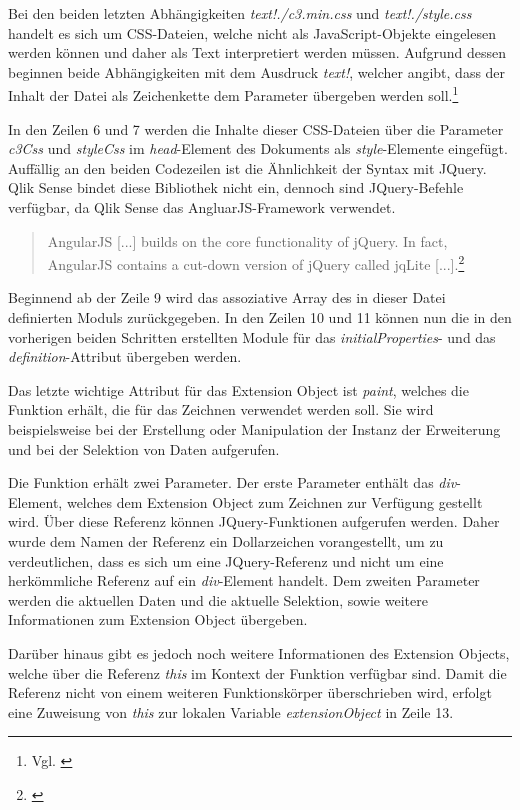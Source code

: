 Bei den beiden letzten Abhängig\-keiten \textit{text!./c3.min.css} und \textit{text!./style.css} handelt es sich um CSS-Dateien, welche nicht als JavaScript-Objekte eingelesen werden können und daher als Text interpretiert werden müssen. Aufgrund dessen beginnen beide Abhängig\-keiten mit dem Ausdruck \textit{text!}, welcher angibt, dass der Inhalt der Datei als Zeichenkette dem Parameter übergeben werden soll.\footnote{Vgl. \cite{SpecifyATextFileDependency}}

In den Zeilen 6 und 7 werden die Inhalte dieser CSS-Dateien über die Parameter \textit{c3Css} und \textit{styleCss} im \textit{head}-Element des Dokuments als \textit{style}-Elemente eingefügt. Auffällig an den beiden Codezeilen ist die Ähnlich\-keit der Syntax mit JQuery. Qlik Sense bindet diese Bibliothek nicht ein, dennoch sind JQuery-Befehle verfügbar, da Qlik Sense das AngluarJS-Framework verwendet.
\begin{quote}
AngularJS [...] builds on the core functionality of jQuery. In fact, AngularJS contains a cut-down version of jQuery called jqLite [...].\footnote{\cite[S. 47]{Freeman2014}}
\end{quote}


Beginnend ab der Zeile 9 wird das assoziative Array des in dieser Datei definierten Moduls zurückgegeben. In den Zeilen 10 und 11 können nun die in den vorherigen beiden Schritten erstellten Module für das \textit{initialProperties}- und das \textit{definition}-Attribut übergeben werden.

Das letzte wichtige Attribut für das Extension Object ist \textit{paint}, welches die Funktion erhält, die für das Zeichnen verwendet werden soll. Sie wird beispielsweise bei der Erstellung oder Manipulation der Instanz der Erweiterung und bei der Selektion von Daten aufgerufen. 

Die Funktion erhält zwei Parameter. Der erste Parameter enthält das \textit{div}-Element, welches dem Extension Object zum Zeichnen zur Verfügung gestellt wird. Über diese Referenz können JQuery-Funktionen aufgerufen werden. Daher wurde dem Namen der Referenz ein Dollarzeichen vorangestellt, um zu verdeutlichen, dass es sich um eine JQuery-Referenz und nicht um eine herkömmliche Referenz auf ein \textit{div}-Element handelt. Dem zweiten Parameter werden die aktuellen Daten und die aktuelle Selektion, sowie weitere Informationen zum Extension Object übergeben. 

Darüber hinaus gibt es jedoch noch weitere Informationen des Extension Objects, welche über die Referenz \textit{this} im Kontext der Funktion verfügbar sind. Damit die Referenz nicht von einem weiteren Funktionskörper überschrieben wird, erfolgt eine Zuweisung von \textit{this} zur lokalen Variable \textit{extensionObject} in Zeile 13.

